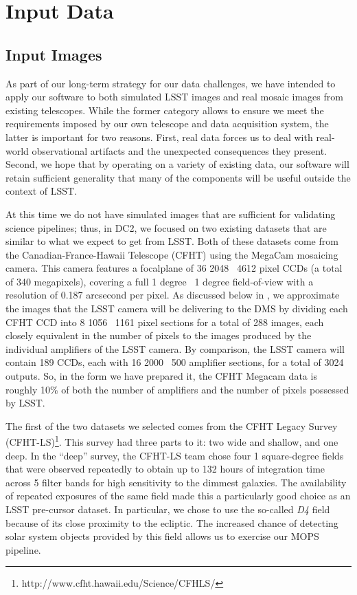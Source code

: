 
\section{Input Data}
\label{sInDat}

\subsection{Input Images}

As part of our long-term strategy for our data challenges, we have
intended to apply our software to both simulated LSST images and real
mosaic images from existing telescopes.  While the former category
allows to ensure we meet the requirements imposed by our own telescope
and data acquisition system, the latter is important for two reasons.
First, real data forces us to deal with real-world observational
artifacts and the unexpected consequences they present.  Second, we
hope that by operating on a variety of existing data, our software will retain
sufficient generality that many of the components will be useful
outside the context of LSST.  

At this time we do not have simulated images that are sufficient for
validating science pipelines; thus, in DC2, we focused on two existing
datasets that are similar to what we expect to get from LSST.  Both of
these datasets come from the Canadian-France-Hawaii Telescope (CFHT)
using the MegaCam mosaicing camera.  This camera features a focalplane 
of 36 2048 \by\ 4612 pixel CCDs (a total of 340 megapixels),
covering a full 1 degree \by\ 1 degree field-of-view with a resolution of
0.187 arcsecond per pixel.  As discussed below in , we
approximate the images that the LSST camera will be delivering to the
DMS by dividing each CFHT CCD into 8 1056 \by\ 1161 pixel sections for a
total of 288 images, each closely equivalent in the number of pixels
to the images produced by the individual amplifiers of the LSST
camera.  By comparison, the LSST camera will contain 189 CCDs, each
with 16 2000 \by\ 500 amplifier sections, for a total of 3024 outputs.
So, in the form we have prepared it, the CFHT Megacam data is roughly
10\% of both the number of amplifiers and the number of pixels
possessed by LSST.

The first of the two datasets we selected comes from the CFHT Legacy
Survey (CFHT-LS)\footnote{http://www.cfht.hawaii.edu/Science/CFHLS/}.
This survey had three parts to it: two wide and
shallow, and one deep.  In the ``deep'' survey, the CFHT-LS
team chose four 1 square-degree fields that were observed repeatedly
to obtain up to 132 hours of integration time across 5 filter bands
for high sensitivity to the dimmest galaxies.  The availability of
repeated exposures of the same field made this a particularly good
choice as an LSST pre-cursor dataset.  In particular, we chose to use
the so-called \textit{D4} field because of its close proximity to the
ecliptic.  The increased chance of detecting solar system objects
provided by this field allows us to exercise our MOPS pipeline.  


